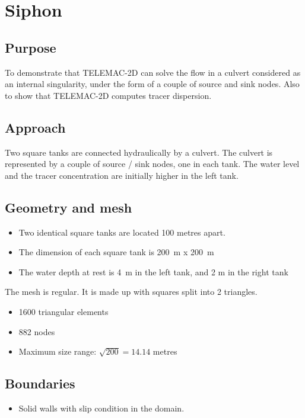 \chapter{Siphon}
\section{Purpose}

To demonstrate that TELEMAC-2D can solve the flow in a culvert considered as
an internal singularity, under the form of a couple of source and sink nodes.
Also to show that TELEMAC-2D computes tracer dispersion.

\section{Approach}

Two square tanks are connected hydraulically by a culvert. The culvert is
represented by a couple of source / sink nodes, one in each tank. The water
level and the tracer concentration are initially higher in the left tank.

\section{Geometry and mesh}

\begin{itemize}
\item  Two identical square tanks are located 100 metres apart.
\item  The dimension of each square tank is 200~m x 200~m
\item  The water depth at rest is 4~m in the left tank, and 2 m in the right tank
\end{itemize}

The mesh is regular. It is made up with squares split into 2 triangles.

\begin{itemize}
\item  1600 triangular elements
\item  882 nodes
\item  Maximum size range: $\sqrt{200} = 14.14$ metres
\end{itemize}

\section{Boundaries}

\begin{itemize}
\item  Solid walls with slip condition in the domain.
\end{itemize}

